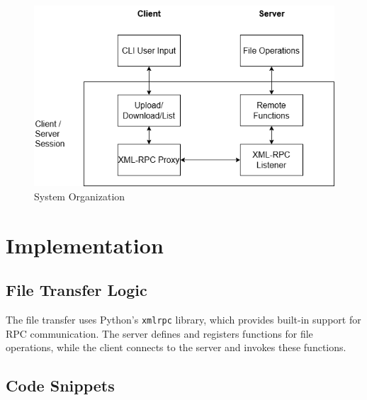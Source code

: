 \documentclass[a4paper,12pt]{article}
\begin{document}
\begin{figure}[h]
    \centering
    \includegraphics[width=\textwidth]{system_organization.png} %
    \caption{System Organization}
    \label{fig:system}
\end{figure}

\section*{Implementation}
\subsection*{File Transfer Logic}
The file transfer uses Python's \texttt{xmlrpc} library, which provides built-in support for RPC communication. The server defines and registers functions for file operations, while the client connects to the server and invokes these functions.

\subsection*{Code Snippets}
\end{document}
